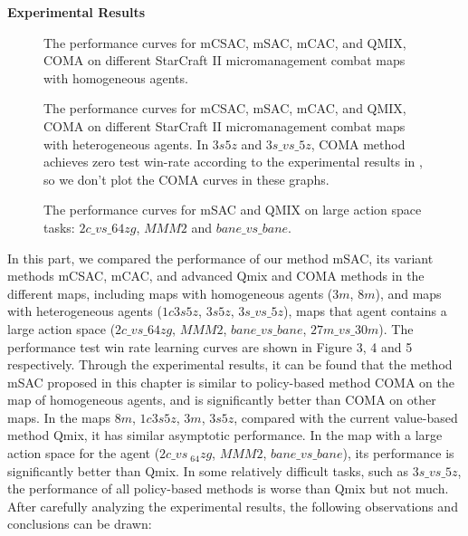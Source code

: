 \documentclass[runningheads]{llncs}
\begin{document}
{\bf Experimental Results}
\begin{figure}[!t]\centering
	\qquad
	\caption{The performance curves for mCSAC, mSAC, mCAC, and QMIX, COMA on different StarCraft II micromanagement combat maps with homogeneous agents.}\label{fig:example}\end{figure}
\begin{figure}[!t]\centering
	\qquad
	\qquad
	\caption{The performance curves for mCSAC, mSAC, mCAC, and QMIX, COMA on different StarCraft II micromanagement combat maps with heterogeneous agents. In $3s5z$ and $3s\_vs\_5z$, COMA method achieves zero test win-rate according to the experimental results in \cite{b18}, so we don't plot the COMA curves in these graphs. }\label{fig:example}\end{figure}
\begin{figure}[!t]\centering
	\qquad
	\qquad
	\caption{The performance curves for mSAC and QMIX on large action space tasks: $2c\_vs\_64zg$, $MMM2$ and $bane\_vs\_bane$. }\label{fig:example}\end{figure}
In this part, we compared the performance of our method mSAC, its variant methods mCSAC, mCAC, and advanced Qmix and COMA methods in the different maps, including
maps with homogeneous agents ($3m$, $8m$), and maps with heterogeneous agents ($1c3s5z$, $3s5z$, $3s\_vs\_5z$), maps that agent contains a large action space ($2c\_vs\_64zg$, $MMM2$, $bane\_vs\_bane$, $27m\_vs\_30m$).
 The performance test win rate learning curves are shown in Figure 3, 4 and 5 respectively.
Through the experimental results, it can be found that the method mSAC proposed in this chapter is similar to  policy-based method COMA on the map of homogeneous agents, and is significantly better than COMA on other maps. In the maps $8m$, $1c3s5z$, $3m$, $3s5z$, compared with the current value-based method Qmix, it has similar asymptotic performance. In the map with a large action space for the agent ($2c\_vs\ _64zg$, $MMM2$, $bane\_vs\_bane$), its performance is significantly better than Qmix. In some relatively difficult tasks, such as $3s\_vs\_5z$, the performance of all policy-based methods is worse than Qmix but not much.
After carefully analyzing the experimental results, the following observations and conclusions can be drawn:
\end{document}
